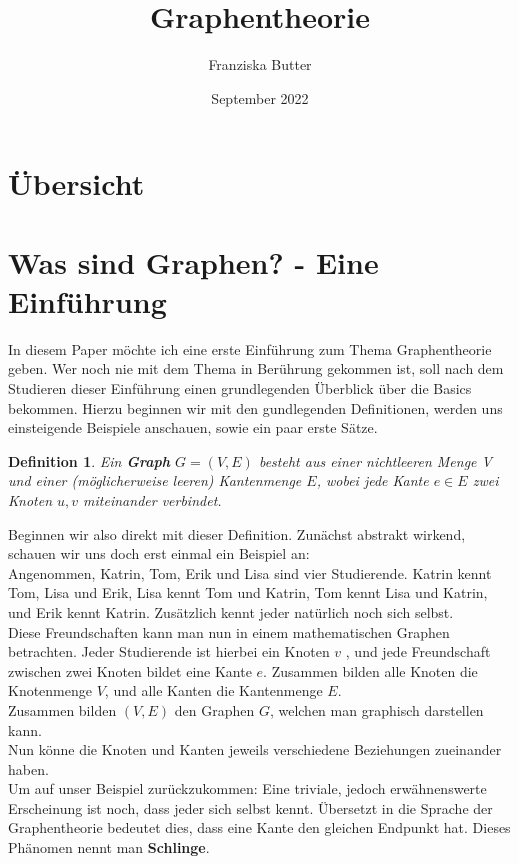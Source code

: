 \documentclass{article}
\title{Graphentheorie}
\author{Franziska Butter}
\date{September 2022}
\newtheorem{definition}{Definition}
\begin{document}
\maketitle

\section{Übersicht}
	\tableofcontents

\newpage

\section{Was sind Graphen? - Eine Einführung}
In diesem Paper möchte ich eine erste Einführung zum Thema Graphentheorie geben. Wer noch nie mit dem Thema in Berührung gekommen ist, soll nach dem Studieren dieser Einführung einen grundlegenden Überblick über die Basics bekommen. Hierzu beginnen wir mit den gundlegenden Definitionen, werden uns einsteigende Beispiele anschauen, sowie ein paar erste Sätze.\\
\bigskip
\begin{definition} 
            Ein \textbf{Graph} \( G = (V, E)\) besteht aus einer nichtleeren Menge V und einer (möglicherweise leeren) Kantenmenge \(E\), wobei jede Kante \(e \in E\) zwei Knoten \(u, v\) miteinander verbindet.
\end{definition}
\bigskip
Beginnen wir also direkt mit dieser Definition. Zunächst abstrakt wirkend, schauen wir uns doch erst einmal ein Beispiel an:\\
Angenommen, Katrin, Tom, Erik und Lisa sind vier Studierende. Katrin kennt Tom, Lisa und Erik, Lisa kennt Tom und Katrin, Tom kennt Lisa und Katrin, und Erik kennt Katrin. Zusätzlich kennt jeder natürlich noch sich selbst.\\
Diese Freundschaften kann man nun in einem mathematischen Graphen betrachten. Jeder Studierende ist hierbei ein Knoten \(v\) , und jede Freundschaft zwischen zwei Knoten bildet eine Kante \(e\). Zusammen bilden alle Knoten die Knotenmenge \(V\), und alle Kanten die Kantenmenge \(E\).\\
Zusammen bilden \((V, E)\) den Graphen \(G\), welchen man graphisch darstellen kann.\\
\bigskip
Nun könne die Knoten und Kanten jeweils verschiedene Beziehungen zueinander haben.\\
Um auf unser Beispiel zurückzukommen: Eine triviale, jedoch erwähnenswerte Erscheinung ist noch, dass jeder sich selbst kennt. Übersetzt in die Sprache der Graphentheorie bedeutet dies, dass eine Kante den gleichen Endpunkt hat. Dieses Phänomen nennt man \textbf{Schlinge}.
\end{document}
